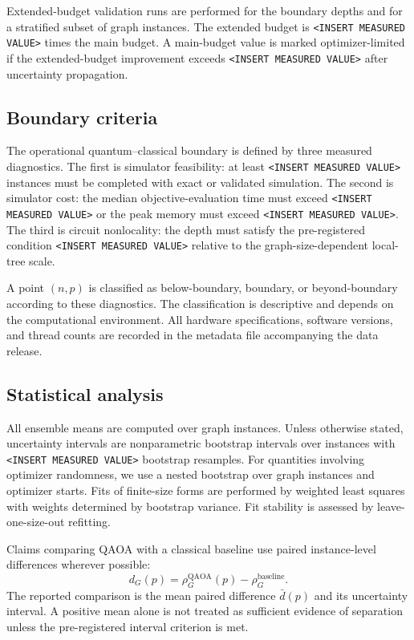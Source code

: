 \documentclass[reprint,aps,longbibliography]{revtex4-2}
\newcommand{\qaoa}{\mathrm{QAOA}}
\begin{document}
Extended-budget validation runs are performed for the boundary depths and for a stratified subset of graph instances. The extended budget is \texttt{<INSERT MEASURED VALUE>} times the main budget. A main-budget value is marked optimizer-limited if the extended-budget improvement exceeds \texttt{<INSERT MEASURED VALUE>} after uncertainty propagation.

\subsection{Boundary criteria}

The operational quantum--classical boundary is defined by three measured diagnostics. The first is simulator feasibility: at least \texttt{<INSERT MEASURED VALUE>} instances must be completed with exact or validated simulation. The second is simulator cost: the median objective-evaluation time must exceed \texttt{<INSERT MEASURED VALUE>} or the peak memory must exceed \texttt{<INSERT MEASURED VALUE>}. The third is circuit nonlocality: the depth must satisfy the pre-registered condition \texttt{<INSERT MEASURED VALUE>} relative to the graph-size-dependent local-tree scale.

A point $(n,p)$ is classified as below-boundary, boundary, or beyond-boundary according to these diagnostics. The classification is descriptive and depends on the computational environment. All hardware specifications, software versions, and thread counts are recorded in the metadata file accompanying the data release.

\subsection{Statistical analysis}

All ensemble means are computed over graph instances. Unless otherwise stated, uncertainty intervals are nonparametric bootstrap intervals over instances with \texttt{<INSERT MEASURED VALUE>} bootstrap resamples. For quantities involving optimizer randomness, we use a nested bootstrap over graph instances and optimizer starts. Fits of finite-size forms are performed by weighted least squares with weights determined by bootstrap variance. Fit stability is assessed by leave-one-size-out refitting.

Claims comparing QAOA with a classical baseline use paired instance-level differences wherever possible:
\begin{equation}
  d_G(p)=\rho_G^{\qaoa}(p)-\rho_G^{\mathrm{baseline}}.
\end{equation}
The reported comparison is the mean paired difference $\bar d(p)$ and its uncertainty interval. A positive mean alone is not treated as sufficient evidence of separation unless the pre-registered interval criterion is met.
\end{document}
